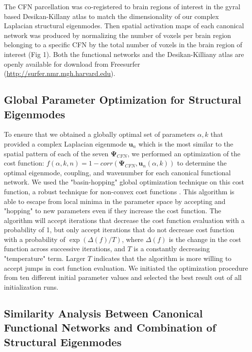 The CFN parcellation was co-registered to brain regions of interest in the gyral based Desikan-Killany atlas \cite{Desikan2006} to match the dimensionality of our complex Laplacian structural eigenmodes. Then spatial activation maps of each canonical network was produced by normalizing the number of voxels per brain region belonging to a specific CFN by the total number of voxels in the brain region of interest (Fig 1). Both the functional networks and the Desikan-Killiany atlas are openly available for download from Freesurfer \cite{Fischl2012} (\url{http://surfer.nmr.mgh.harvard.edu}).

\subsection{Global Parameter Optimization for Structural Eigenmodes}
To ensure that we obtained a globally optimal set of parameters ${\alpha, k}$ that provided a complex Laplacian eigenmode $\pmb{u}_n$ which is the most similar to the spatial pattern of each of the seven $\pmb{\Psi}_{CFN}$, we performed
an optimization of the cost function: $f(\alpha,k,n) = 1- corr(\pmb{\Psi}_{CFN}, \pmb{u}_n(\alpha, k))$ to determine the optimal eigenmode, coupling, and wavenumber for each canonical functional network. We used the "basin-hopping" global optimization technique on this cost function, a robust technique for non-convex cost functions \cite{Wales1997}. This algorithm is able to escape from local minima in the parameter space by accepting and "hopping" to new parameters even if they increase the cost function. The algorithm will accept iterations that decrease the cost function evaluation with a probability of 1, but only accept iterations that do not decrease cost function with a probability of $\exp(\Delta (f)/{T})$, where $\Delta(f)$ is the change in the cost function across successive iterations, and $T$ is a constantly decreasing "temperature" term. Larger $T$ indicates that the algorithm is more willing to accept jumps in cost function evaluation. We initiated the optimization procedure from ten different initial parameter values and selected the best result out of all initialization runs.

\subsection{Similarity Analysis Between Canonical Functional Networks and Combination of Structural Eigenmodes}

